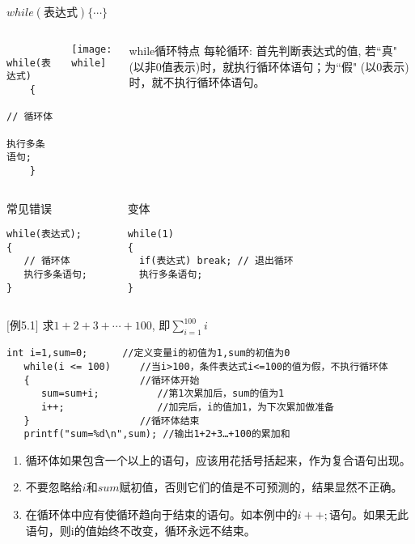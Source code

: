 \begin{frame}{$while(\text{表达式})\{ \cdots\}$}
\vspace{-0.5cm}
\begin{columns}[T]
	\begin{lstlisting} 
    while(表达式)   
    {
       // 循环体
       执行多条语句;  
    }   
    \end{lstlisting}
	\texttt{[image: while]}
	\small
	\begin{block}{while循环特点}
		\small
		每轮循环: 首先判断表达式的值, 若``真" (以非0值表示)时，就执行循环体语句；为``假" (以0表示)时，就不执行循环体语句。
	\end{block}
\end{columns}
\vspace{-0.5cm}
\begin{columns}
\begin{block}{常见错误}
\begin{lstlisting} 
while(表达式); 
{
   // 循环体
   执行多条语句;    
}
\end{lstlisting}
\end{block}
\begin{block}{变体}
\begin{lstlisting} 
while(1)  
{
  if(表达式) break; // 退出循环
  执行多条语句;    
}
\end{lstlisting}
\end{block}
\end{columns}
\end{frame}

\begin{frame}
$[$例5.1$]$ 求$1+2+3+\cdots+100$, 即$\sum\limits_{i=1}^{100}i$
\medskip
\begin{lstlisting}[frame=lines]
   int i=1,sum=0;      //定义变量i的初值为1,sum的初值为0  
   while(i <= 100)     //当i>100，条件表达式i<=100的值为假，不执行循环体
   {                   //循环体开始
      sum=sum+i;          //第1次累加后，sum的值为1
      i++;                //加完后，i的值加1，为下次累加做准备
   }                   //循环体结束
   printf("sum=%d\n",sum); //输出1+2+3…+100的累加和                
\end{lstlisting}
\begin{enumerate}
	\setlength{\itemsep}{.2cm}
	\item 循环体如果包含一个以上的语句，应该用花括号括起来，作为复合语句出现。
	\item 不要忽略给$i$和$sum$赋初值，否则它们的值是不可预测的，结果显然不正确。
	\item 在循环体中应有使循环趋向于结束的语句。如本例中的$i++;$语句。如果无此语句，则i的值始终不改变，循环永远不结束。
\end{enumerate}
\end{frame}

